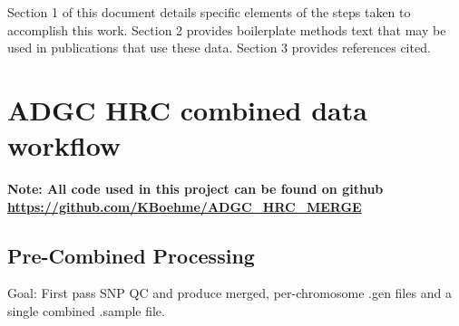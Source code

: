 \documentclass[12pt]{article}
\begin{document}
Section 1 of this document details specific elements of the steps taken to accomplish this work. Section 2 provides boilerplate methods text that may be used in publications that use these data. Section 3 provides references cited.


\section{ADGC HRC combined data workflow}

\textbf{Note: All code used in this project can be found on github \url{https://github.com/KBoehme/ADGC_HRC_MERGE}}


\subsection{Pre-Combined Processing}
Goal: First pass SNP QC and produce merged, per-chromosome .gen files and a single combined .sample file.
\end{document}
